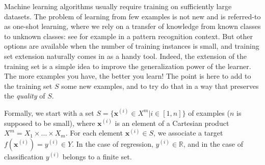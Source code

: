 Machine learning algorithms usually require training on sufficiently large
datasets. The problem of learning from few examples is not new and is
referred-to as one-shot learning, where we rely on a transfer of knowledge from
known classes to unknown classes: see  for example \cite{LiFerPerPAMI06} in a
pattern recognition context.  But other options are available when the number
of training instances is small, and training set extension naturally comes in
as a handy tool. Indeed, the extension of the training set is a simple idea to
improve the generalization power of the learner.  The more examples you have, the
better you learn! The point is here to add to the training set $S$ some new
examples, and to try do that in a way that preserves the \textit{quality} of
$S$.

Formally, we start with a set $S= \{\mathbf{x}^{(i)} \in X^m| i \in
[1,n]\}$ of examples ($n$ is supposed to be small), where $\mathbf{x}^{(i)}$ is
an element of a Cartesian product $X^m = X_1 \times \ldots \times X_m$.
For each element  $\mathbf{x}^{(i)} \in S$, we associate a target
$f(\mathbf{x}^{(i)})=y^{(i)} \in Y$.  In the case of regression, $y^{(i)} \in
\mathbb{R}$, and in the case of classification $y^{(i)}$ belongs to a finite
set.


